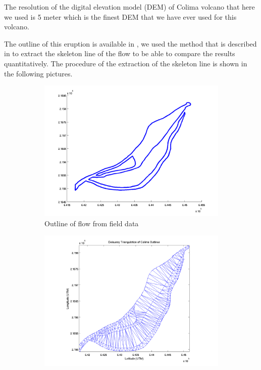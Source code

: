 \documentclass[letterpaper,10pt]{article}
\begin{document}
The resolution of the digital elevation model (DEM) of Colima volcano that here we used is 5 meter which is the finest DEM 
that we have ever used for this volcano.

The outline of this eruption is available in \cite{NamikawaPhD}, we used the method that is described in \cite{NamikawaPhD} to 
extract the skeleton line of the flow to be able to compare the results quantitatively. The procedure of the extraction of the 
skeleton line is shown in the following pictures. 

\begin{figure}
        \centering
        \begin{subfigure}[b]{0.45\textwidth}
                \includegraphics[width=\textwidth]{IMAGES/pics/outline.png}
                \caption{Outline of flow from field data}
                \label{fig:Outline}
        \end{subfigure}%
        \begin{subfigure}[b]{0.45\textwidth}
                \includegraphics[width=\textwidth]{IMAGES/pics/Delaunay_Triangulation_of_Colima_clean.png}

\end{subfigure}
\end{figure}
\end{document}
